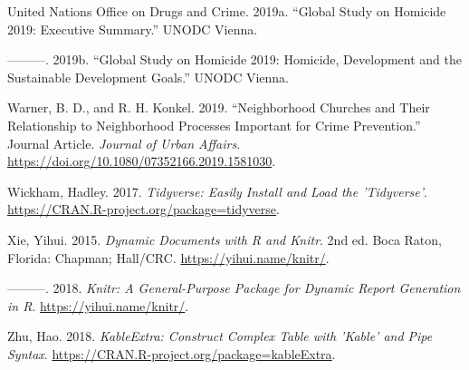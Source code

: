 \documentclass[smallextended]{svjour3}       %
\begin{document}
\leavevmode\hypertarget{ref-Unodc2019executive}{}%
United Nations Office on Drugs and Crime. 2019a. ``Global Study on
Homicide 2019: Executive Summary.'' UNODC Vienna.

\leavevmode\hypertarget{ref-Unodc2019development}{}%
---------. 2019b. ``Global Study on Homicide 2019: Homicide, Development
and the Sustainable Development Goals.'' UNODC Vienna.

\leavevmode\hypertarget{ref-Warner2019neighborhood}{}%
Warner, B. D., and R. H. Konkel. 2019. ``Neighborhood Churches and Their
Relationship to Neighborhood Processes Important for Crime Prevention.''
Journal Article. \emph{Journal of Urban Affairs}.
\url{https://doi.org/10.1080/07352166.2019.1581030}.

\leavevmode\hypertarget{ref-Wickham2017}{}%
Wickham, Hadley. 2017. \emph{Tidyverse: Easily Install and Load the
'Tidyverse'}. \url{https://CRAN.R-project.org/package=tidyverse}.

\leavevmode\hypertarget{ref-Xie2015}{}%
Xie, Yihui. 2015. \emph{Dynamic Documents with R and Knitr}. 2nd ed.
Boca Raton, Florida: Chapman; Hall/CRC. \url{https://yihui.name/knitr/}.

\leavevmode\hypertarget{ref-Xie2018}{}%
---------. 2018. \emph{Knitr: A General-Purpose Package for Dynamic
Report Generation in R}. \url{https://yihui.name/knitr/}.

\leavevmode\hypertarget{ref-Zhu2018}{}%
Zhu, Hao. 2018. \emph{KableExtra: Construct Complex Table with 'Kable'
and Pipe Syntax}. \url{https://CRAN.R-project.org/package=kableExtra}.



\end{document}
